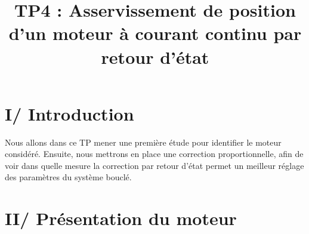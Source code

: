 \documentclass[../../Cours_M1.tex]{subfiles}
\title{TP4 : Asservissement de position d'un moteur à courant continu par retour d'état}
\author{\auteur}
\begin{document}
\maketitle

\section*{I/ Introduction}
Nous allons dans ce TP mener une première étude pour identifier le moteur considéré. Ensuite, nous mettrons en place une correction proportionnelle, afin de voir dans quelle mesure la correction par retour d'état permet un meilleur réglage des paramètres du système bouclé.


\section*{II/ Présentation du moteur}
\end{document}
